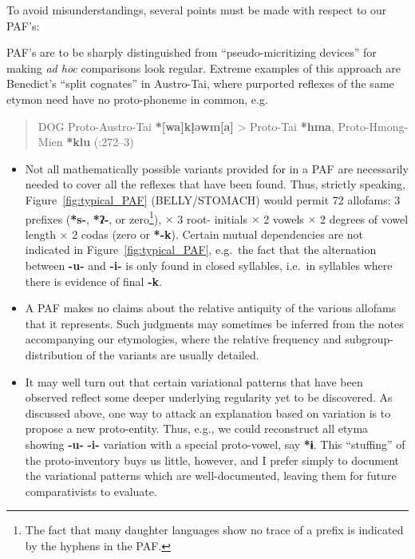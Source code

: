To avoid misunderstandings, several points must be made with respect to our PAF’s:

PAF’s are to be sharply distinguished from “pseudo-micritizing devices” for making \textit{ad hoc} comparisons look regular. Extreme examples of this approach are Benedict’s “split cognates” in Austro-Tai, where purported reflexes of the same etymon need have no proto-phoneme in common, e.g.\ 
\begin{quote}
DOG \hfill Proto-Austro-Tai \textbf{*[wa]k\d{l}əwm[a]} > Proto-Tai \textbf{*hma}, Proto-Hmong-Mien \textbf{*klu} (\citealt{PKB-ATLC}:272–3)
\end{quote}

\begin{itemize}
\item Not all mathematically possible variants provided for in a PAF are necessarily needed to cover all the reflexes that have been found.
Thus, strictly speaking, Figure~\ref{fig:typical_PAF} (BELLY/STOMACH) would permit 72 allofams: 3 prefixes (\textbf{*s-}, \textbf{*ʔ-}, or
zero\footnote{The fact that many daughter languages show no trace of a prefix is indicated by the hyphens in the PAF.}), $\times$ 3 root-
initials $\times$ 2 vowels $\times$ 2 degrees of vowel length $\times$ 2 codas (zero or \textbf{*-k}). Certain mutual dependencies are not
indicated in Figure~\ref{fig:typical_PAF}, e.g.\ the fact that the alternation between \textbf{-u-} and \textbf{-i-} is only found in closed
syllables, i.e.\ in syllables where there is evidence of final \textbf{-k}.

\item A PAF makes no claims about the relative antiquity of the various allofams that it represents. Such judgments may sometimes be inferred
from the notes accompanying our etymologies, where the relative frequency and subgroup-distribution of the variants are usually detailed.

\item It may well turn out that certain variational patterns that have been observed reflect some deeper underlying regularity yet to be
discovered. As discussed above, one way to attack an explanation based on variation is to propose a new proto-entity. Thus, e.g., we could
reconstruct all etyma showing \textbf{-u-} \STEDTU{⪤} \textbf{-i-} variation with a special proto-vowel, say \textbf{*ɨ}. This “stuffing” of
the proto-inventory buys us little, however, and I prefer simply to document the variational patterns which are well-documented, leaving them
for future comparativists to evaluate.
\end{itemize}

